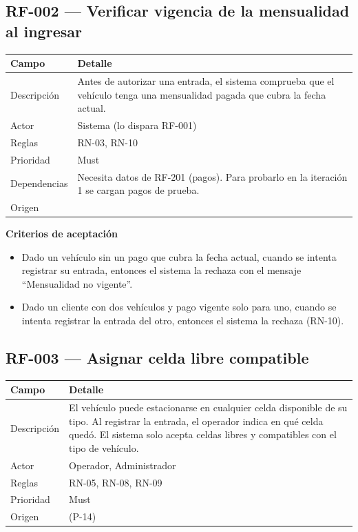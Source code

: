 \subsection{RF-002 — Verificar vigencia de la mensualidad al ingresar}
\begin{longtable}{>{\raggedright\arraybackslash}p{3.2cm}>{\raggedright\arraybackslash}p{11.2cm}}
\toprule
\textbf{Campo} & \textbf{Detalle}\\
\midrule\endhead
Descripción & Antes de autorizar una entrada, el sistema comprueba que el vehículo tenga una mensualidad pagada que cubra la fecha actual.\\
Actor & Sistema (lo dispara RF-001)\\
Reglas & RN-03, RN-10\\
Prioridad & Must\\
Dependencias & Necesita datos de RF-201 (pagos). Para probarlo en la iteración 1 se cargan pagos de prueba.\\
Origen & [U]\\
\bottomrule
\end{longtable}

\textbf{Criterios de aceptación}
\begin{itemize}
  \item Dado un vehículo sin un pago que cubra la fecha actual, cuando se intenta registrar su entrada, entonces el sistema la rechaza con el mensaje ``Mensualidad no vigente''.
  \item Dado un cliente con dos vehículos y pago vigente solo para uno, cuando se intenta registrar la entrada del otro, entonces el sistema la rechaza (RN-10).
\end{itemize}

\subsection{RF-003 — Asignar celda libre compatible}
\begin{longtable}{>{\raggedright\arraybackslash}p{3.2cm}>{\raggedright\arraybackslash}p{11.2cm}}
\toprule
\textbf{Campo} & \textbf{Detalle}\\
\midrule\endhead
Descripción & El vehículo puede estacionarse en cualquier celda disponible de su tipo. Al registrar la entrada, el operador indica en qué celda quedó. El sistema solo acepta celdas libres y compatibles con el tipo de vehículo.\\
Actor & Operador, Administrador\\
Reglas & RN-05, RN-08, RN-09\\
Prioridad & Must\\
Origen & [U] (P-14)\\
\bottomrule
\end{longtable}

